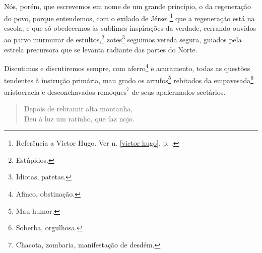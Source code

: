 Nós, porém, que escrevemos em nome de um grande princípio, o da
regeneração do povo, porque entendemos, com o exilado de
Jérsei,\footnote{Referência a Victor Hugo. Ver n. \ref{victor hugo}, 
p. \pageref{victor hugo}.} que a regeneração está na escola; e que só 
obedecemos às sublimes inspirações da verdade, cerrando ouvidos ao 
parvo murmurar de estultos,\footnote{Estúpidos.} zotes\footnote{Idiotas, 
patetas.} seguimos vereda segura, guiados pela estrela precursora que 
se levanta radiante das partes do Norte.

Discutimos e discutiremos sempre, com aferro\footnote{Afinco,
  obstinação.} e acuramento, todas as questões tendentes à instrução
primária, mau grado os arrufos\footnote{Mau humor.} rebitados da
empavesada\footnote{Soberba, orgulhosa.} aristocracia e desconchavados
remoques\footnote{Chacota, zombaria, manifestação de desdém.} de seus
apalermados sectários.

\begin{verse}
Depois de rebramir alta montanha,\\
Deu à luz um ratinho, que faz nojo.
\end{verse}

